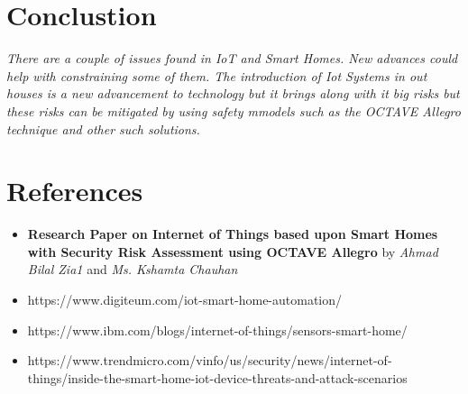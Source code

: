 \documentclass{article}
\begin{document}
\section{Conclustion}
\textit{There are a couple
of issues found in IoT and Smart Homes. New advances
could help with constraining some of them.
The introduction of Iot Systems in out houses is a new advancement to technology but it brings along with it big risks but these risks can be mitigated by using safety mmodels such as the OCTAVE Allegro technique and other such solutions.}
\section{References}
\begin{itemize}
    \item \textbf{Research Paper on Internet of Things based
upon Smart Homes with Security Risk
Assessment using OCTAVE Allegro}
by \textit{Ahmad Bilal Zia1} and \textit{Ms. Kshamta Chauhan}
    \item https://www.digiteum.com/iot-smart-home-automation/
    \item https://www.ibm.com/blogs/internet-of-things/sensors-smart-home/
    \item https://www.trendmicro.com/vinfo/us/security/news/internet-of-things/inside-the-smart-home-iot-device-threats-and-attack-scenarios
\end{itemize}
\end{document}
